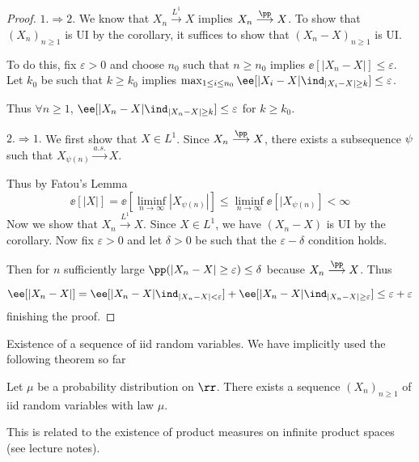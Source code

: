 \documentclass[../main.tex]{subfiles}
\begin{document}
\begin{proof}
  $\boxed{1. \Rightarrow 2.}$ We know that  $X_n \overset{L^1}{\longrightarrow}
  X$ implies $X_n \overset{\pp}{\longrightarrow}X$. To show that $(X_n)_{n \geq
  1}$ is UI by the corollary, it suffices to show that $(X_n - X)_{n \geq 1}$ is
  UI.
  \vspace{0.4em}

  \noindent
  To do this, fix $\varepsilon>0$ and choose $n_0$ such that $n \geq n_0$
  implies $\ee[|X_n - X|] \leq \varepsilon$. Let $k_0$ be such that $k \geq k_0$
  implies $\max _{1 \leq i \leq n_0} \ee[|X_i - X| \ind_{|X_i - X| \geq k}] \leq
  \varepsilon$.

  \vspace{0.4em}
  \noindent
  Thus $\forall n \geq 1$, $\ee[|X_n - X| \ind_{|X_n - X| \geq k}] \leq
  \varepsilon$ for $k \geq k_0$.

  \vspace{1em}
  \noindent
  $\boxed{2. \Rightarrow 1.}$ We first show that $X \in L^1$. Since $X_n
  \overset{\pp}{\longrightarrow} X$, there exists a subsequence $\psi$ such
  that $X_{\psi(n)} \overset{a.s.}{\longrightarrow} X$.

  \vspace{0.4em}
  \noindent
  Thus by Fatou's Lemma 
  \[
    \ee[|X|] = \ee[\liminf_{n \to \infty} |X_{\psi(n)}|] \leq \liminf_{n \to
    \infty} \ee[|X_{\psi(n)}] < \infty
  \] 
  Now we show that $X_n \overset{L^1}{\longrightarrow} X$. Since $X \in L^1$, we
  have $(X_n - X)$ is UI by the corollary. Now fix $\varepsilon > 0$ and let
  $\delta > 0$ be such that the $\varepsilon-\delta$ condition holds.

  \vspace{0.4em}
  \noindent
  Then for $n$ sufficiently large $\pp(|X_n - X| \geq \varepsilon) \leq \delta$
  because $X_n \overset{\pp}{\longrightarrow} X$. Thus

  \[
    \ee[|X_n - X|] = \ee[|X_n - X|\ind_{|X_n - X| < \varepsilon }] + 
    \ee[|X_n - X|\ind_{|X_n - X| \geq \varepsilon }]
    \leq \varepsilon + \varepsilon
  \] 
  finishing the proof.
\end{proof}
\begin{remark}
    Existence of a sequence of iid random variables. We have implicitly used the
    following theorem so far
\begin{theorem}
  Let $\mu$ be a probability distribution on $\rr$. There exists a sequence
  $(X_n)_{n \geq 1}$ of iid random variables with law $\mu$.
\end{theorem}
    This is related to the existence of product measures on infinite product
    spaces (see lecture notes).
\end{remark}
\end{document}
